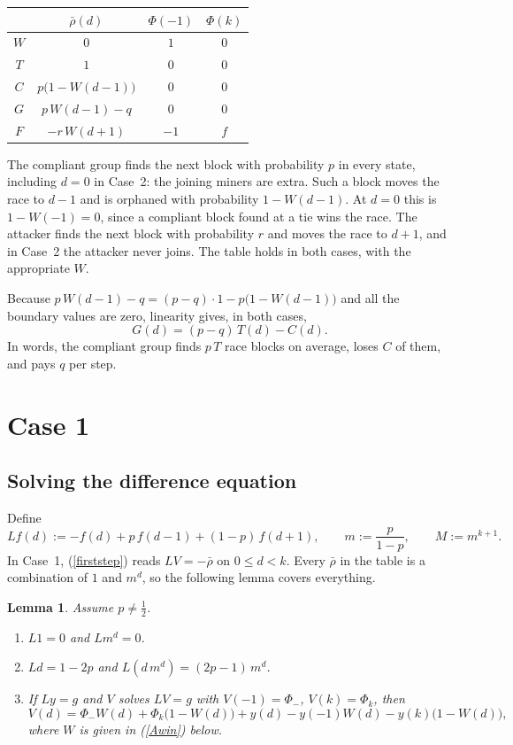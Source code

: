 \documentclass{article}%
\newtheorem{lemma}[theorem]{Lemma}
\begin{document}
\begin{center}%
\begin{tabular}
[c]{c|c|cc}%
& $\bar{\rho}(d)$ & $\Phi(-1)$ & $\Phi(k)$\\\hline
$W$ & $0$ & $1$ & $0$\\
$T$ & $1$ & $0$ & $0$\\
$C$ & $p\bigl(1-W(d-1)\bigr)$ & $0$ & $0$\\
$G$ & $p\,W(d-1)-q$ & $0$ & $0$\\
$F$ & $-r\,W(d+1)$ & $-1$ & $f$%
\end{tabular}
\end{center}

\noindent The compliant group finds the next block with probability $p$ in
every state, including $d=0$ in Case~2: the joining miners are extra. Such a
block moves the race to $d-1$ and is orphaned with probability $1-W(d-1)$. At
$d=0$ this is $1-W(-1)=0$, since a compliant block found at a tie wins the
race. The attacker finds the next block with probability $r$ and moves the
race to $d+1$, and in Case~2 the attacker never joins. The table holds in both
cases, with the appropriate $W$.

Because $p\,W(d-1)-q=(p-q)\cdot1-p\bigl(1-W(d-1)\bigr)$ and all the boundary
values are zero, linearity gives, in both cases,%
\begin{equation}
G(d)=(p-q)\,T(d)-C(d). \label{GTC}%
\end{equation}
In words, the compliant group finds $p\,T$ race blocks on average, loses $C$
of them, and pays $q$ per step.

\section{Case 1}

\subsection{Solving the difference equation}

Define
\[
Lf(d):=-f(d)+p\,f(d-1)+(1-p)\,f(d+1),\qquad m:=\frac{p}{1-p},\qquad
M:=m^{k+1}.
\]
In Case~1, (\ref{firststep}) reads $LV=-\bar{\rho}$ on $0\leq d<k$. Every
$\bar{\rho}$ in the table is a combination of $1$ and $m^{d}$, so the
following lemma covers everything.

\begin{lemma}
\label{lem:L}Assume $p\neq\frac{1}{2}$.

\begin{enumerate}
\item[(i)] $L1=0$ and $Lm^{d}=0$.

\item[(ii)] $Ld=1-2p$ and $L(d\,m^{d})=(2p-1)\,m^{d}$.

\item[(iii)] If $Ly=g$ and $V$ solves $LV=g$ with $V(-1)=\Phi_{-}$,
$V(k)=\Phi_{k}$, then
\begin{equation}
V(d)=\Phi_{-}W(d)+\Phi_{k}\bigl(1-W(d)\bigr)+y(d)-y(-1)W(d)-y(k)\bigl(1-W(d)\bigr),
\label{bvp}%
\end{equation}
where $W$ is given in (\ref{Awin}) below.
\end{enumerate}
\end{lemma}
\end{document}
